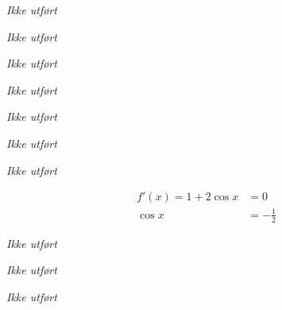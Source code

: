 \documentclass[a4paper,norsk,12pt]{article}
\begin{document}
\textit{Ikke utført}

\textit{Ikke utført}

\textit{Ikke utført}

\textit{Ikke utført}

\textit{Ikke utført}

\textit{Ikke utført}

\textit{Ikke utført}

\begin{align*}
  f'(x) = 1 + 2\cos{x} & = 0\\
  \cos{x} & = -\frac{1}{2}
\end{align*}

\textit{Ikke utført}

\textit{Ikke utført}

\textit{Ikke utført}
\end{document}
